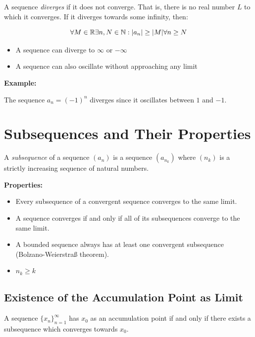A sequence \emph{diverges} if it does not converge. That is, there is no real number \(L\) to which it converges. If it diverges towards some infinity, then:

\[
	\forall M \in \mathbb{R} \exists n,N \in \mathbb{N} : |a_n| \ge |M| \forall n \ge N
\]

\begin{itemize}

	\item A sequence can diverge to \(\infty\) or \(-\infty\)

	\item A sequence can also oscillate without approaching any limit

\end{itemize}

\textbf{Example:}

The sequence \(a_n = {(-1)}^n\) diverges since it oscillates between \(1\) and \(-1\).

\section{Subsequences and Their Properties}

A \emph{subsequence} of a sequence \((a_n)\) is a sequence \((a_{n_k})\) where \((n_k)\) is a strictly
increasing sequence of natural numbers.

\textbf{Properties:}

\begin{itemize}

	\item Every subsequence of a convergent sequence converges to the same limit.

	\item A sequence converges if and only if all of its subsequences converge to the same limit.

	\item A bounded sequence always has at least one convergent subsequence (Bolzano-Weierstraß theorem).

	\item \(n_k \ge k\)

\end{itemize}

\subsection{Existence of the Accumulation Point as Limit}

A sequence \(\{x_n\}_{n = 1}^{\infty}\) has \(x_0\) as an accumulation point if and only if there exists a subsequence
which converges towards \(x_0\).

